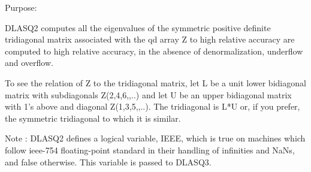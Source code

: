 \begin{DoxyParagraph}{Purpose\+: }
\begin{DoxyVerb} DLASQ2 computes all the eigenvalues of the symmetric positive 
 definite tridiagonal matrix associated with the qd array Z to high
 relative accuracy are computed to high relative accuracy, in the
 absence of denormalization, underflow and overflow.

 To see the relation of Z to the tridiagonal matrix, let L be a
 unit lower bidiagonal matrix with subdiagonals Z(2,4,6,,..) and
 let U be an upper bidiagonal matrix with 1's above and diagonal
 Z(1,3,5,,..). The tridiagonal is L*U or, if you prefer, the
 symmetric tridiagonal to which it is similar.

 Note : DLASQ2 defines a logical variable, IEEE, which is true
 on machines which follow ieee-754 floating-point standard in their
 handling of infinities and NaNs, and false otherwise. This variable
 is passed to DLASQ3.\end{DoxyVerb}
 
\end{DoxyParagraph}

